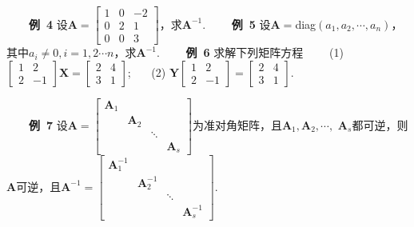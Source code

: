 \documentclass[compress,mathserif,cjk]{beamer}
\theoremstyle{remark}
\numberwithin{equation}{section}
\newcommand{\hei}{\bf}      %
\begin{document}
\begin{CJK}{UTF8}{gbsn}
\begin{frame}
 \ \ \ \ {\hei 例~4} 设$\bm A=\left[\begin{matrix}1&0&-2\\0&2&1\\0&0&3\end{matrix}\right]$，求$\bm A^{-1}$.
 \pause\vskip 10pt
 \ \ \ \ {\hei 例~5} 设$\bm A=$diag$(a_1,a_2,\cdots,a_n)$，其中$a_i\neq0,i=1,2\cdots n$，求$\bm A^{-1}$.
 \pause\vskip 10pt
 \ \ \ \ {\hei 例~6} 求解下列矩阵方程
 \vskip 2pt
 \ \ \ \ (1) $\left[\begin{matrix}1&2\\2&-1\end{matrix}\right]\bm X=\left[\begin{matrix}2&4\\3&1\end{matrix}\right]$;
 \ \ \ (2) $\bm Y\left[\begin{matrix}1&2\\2&-1\end{matrix}\right]=\left[\begin{matrix}2&4\\3&1\end{matrix}\right]$.
  \end{frame}

\begin{frame}
 \ \ \ \ {\hei 例~7} 设$\bm A=\left[\begin{matrix}\bm A_1&&& \\&\bm A_2&& \\ &&\ddots&\\&&& \bm A_s\end{matrix}\right]$为准对角矩阵，且$\bm A_1,\bm A_2,\cdots,$ $\bm A_s$都可逆，则$\bm A$可逆，且$\bm A^{-1}=\left[\begin{matrix}\bm A_1^{-1}&&& \\&\bm A_2^{-1}&& \\ &&\ddots&\\&&& \bm A_s^{-1}\end{matrix}\right]$.
\end{frame}


\end{CJK}
\end{document}
